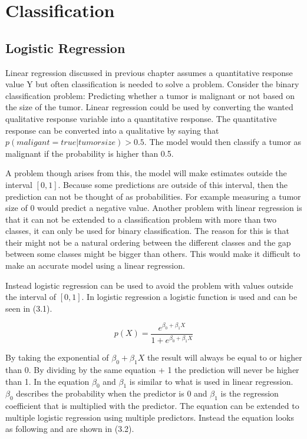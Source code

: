 \chapter{Classification}

\section{Logistic Regression}
\label{chp:logreg}
Linear regression discussed in previous chapter assumes a quantitative response value Y but often classification is needed to solve a problem. Consider the binary classification problem: Predicting whether a tumor is malignant or not based on the size of the tumor. Linear regression could be used by converting the wanted qualitative response variable into a quantitative response. The quantitative response can be converted into a qualitative by saying that $p(maligant = true | tumorsize) > 0.5$. The model would then classify a tumor as malignant if the probability is higher than 0.5. 

A problem though arises from this, the model will make estimates outside the interval $[0,1]$. Because some predictions are outside of this interval, then the prediction can not be thought of as probabilities. For example measuring a tumor size of 0 would predict a negative value. Another problem with linear regression is that it can not be extended to a classification problem with more than two classes, it can only be used for binary classification. The reason for this is that their might not be a natural ordering between the different classes and the gap between some classes might be bigger than others. This would make it difficult to make an accurate model using a linear regression.

Instead logistic regression can be used to avoid the problem with values outside the interval of $[0,1]$. In logistic regression a logistic function is used and can be seen in (3.1).


\begin{equation}
	p(X) = \dfrac{e^{\beta_0 + \beta_1 X}}{1 + e^{\beta_0 + \beta_1 X}}
\end{equation}

By taking the exponential of $\beta_0 + \beta_1 X$ the result will always be equal to or higher than 0. By dividing by the same equation + 1 the prediction will never be higher than 1. In the equation $\beta_0$ and $\beta_1$ is similar to what is used in linear regression. $\beta_0$ describes the probability when the predictor is 0 and $\beta_1$ is the regression coefficient that is multiplied  with the predictor. The equation can be extended to multiple logistic regression using multiple predictors. Instead the equation looks as following and are shown in (3.2).

